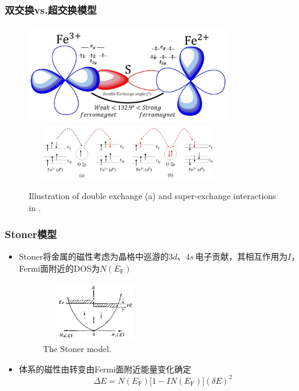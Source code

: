 {\frame
{
	\frametitle{双交换\textrm{vs.}超交换模型}
\begin{figure}[h!]
	\vspace{-0.15in}
\centering
\includegraphics[height=1.70in,width=3.45in,viewport=0 0 1500 700,clip]{Figures/Double-exchange-model.jpg}
\includegraphics[height=0.90in,width=3.45in,viewport=0 0 640 200,clip]{Figures/Illustration-of-double-exchange-and-superexchange-interactions-in-Fe-3-O-4.jpg}
\caption{\tiny \textrm{Illustration of double exchange (a) and super-exchange interactions in .}}%
\label{double-super-exchange-2}
\end{figure}
}

\frame
{
	\frametitle{\textrm{Stoner}模型}
	\begin{itemize}
		\item \textrm{Stoner}将金属的磁性考虑为晶格中巡游的$3d$、$4s$\,电子贡献，其相互作用为$I$，\textrm{Fermi}面附近的\textrm{DOS}为$N(E_{\mathrm F})$
\begin{figure}[h!]
\centering
\vspace*{-0.05in}
\includegraphics[height=1.0in,width=1.8in,viewport=0 0 800 380,clip]{Figures/Mag_Metal-T0.png}
\caption{\tiny \textrm{The Stoner model.}}%
\label{Mag_Metal-T0}
\end{figure}
		\item 体系的磁性由转变由\textrm{Fermi}面附近能量变化确定
			\begin{displaymath}
				\Delta E=N(E_{\mathrm F})\big[1-IN(E_{\mathrm F})\big](\delta E)^2
			\end{displaymath}
	\end{itemize}
}

}
